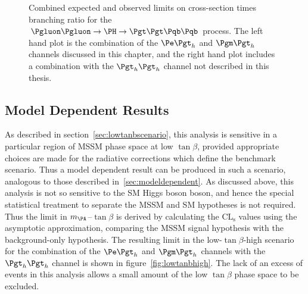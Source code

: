 \begin{figure}
\begin{center}

\end{center}
\caption[Combined expected and observed limits on cross-section times branching ratio for the
$\Pgluon\Pgluon\to\PH\to\Pgt\Pgt\Pqb\Pqb$ process.]{
Combined expected and observed limits on cross-section times branching ratio for the
$\Pgluon\Pgluon\to\PH\to\Pgt\Pgt\Pqb\Pqb$ process. The left hand plot is the
combination of the $\etau$ and $\mutau$ channels discussed in this chapter, and
the right hand plot includes a combination with the $\tautau$ channel not
described in this thesis.}
\label{fig:HhhCmblimits}
\end{figure}

\subsection{Model Dependent Results}

As described in section~\ref{sec:lowtanbscenario}, this analysis is sensitive in
a particular region of \ac{MSSM} phase space at low $\tan\beta$, provided
appropriate choices are made for the radiative corrections which define the
benchmark scenario. Thus a model dependent result can be produced in such a
scenario, analogous to those described in~\ref{sec:modeldependent}. As discussed
above, this analysis is not so sensitive to the \ac{SM} Higgs boson boson, and hence
the special statistical treatment to separate the \ac{MSSM} and \ac{SM}
hypotheses is not required. Thus the limit in $m_{\PA}$--$\tan\beta$ is derived
by calculating the $\mathrm{CL_{s}}$ values using the asymptotic approximation, comparing
the \ac{MSSM} signal hypothesis with the background-only hypothesis. The
resulting limit in the low-$\tan\beta$-high scenario for the combination of the
$\etau$ and $\mutau$ channels with the $\tautau$ channel is shown in
figure~\ref{fig:lowtanbhigh}. The lack of an excess of events in this analysis
allows a small amount of the low $\tan\beta$ phase space to be excluded.

